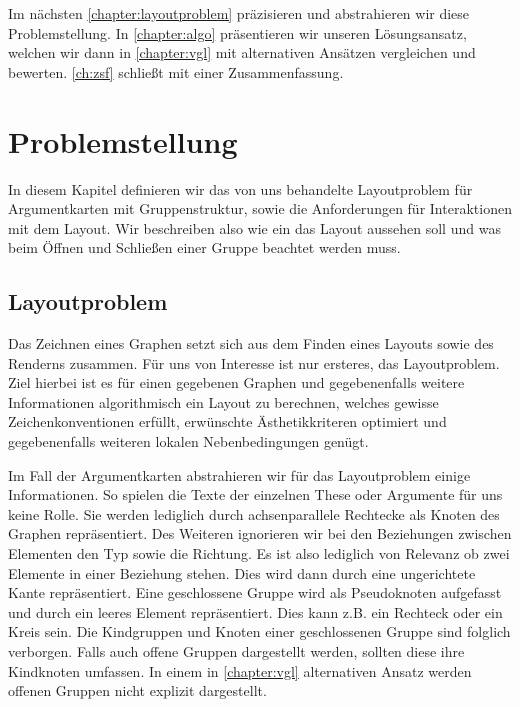 Im nächsten \autoref{chapter:layoutproblem}  präzisieren und abstrahieren wir diese Problemstellung. 
In \autoref{chapter:algo} präsentieren wir unseren Lösungsansatz, welchen wir dann in \autoref{chapter:vgl} mit alternativen Ansätzen vergleichen und bewerten.
\autoref{ch:zsf} schließt mit einer Zusammenfassung.

\chapter{Problemstellung}%
\label{chapter:layoutproblem}
In diesem Kapitel definieren wir das von uns behandelte Layoutproblem für Argumentkarten mit Gruppenstruktur, sowie die Anforderungen für Interaktionen mit dem Layout.
Wir beschreiben also wie ein das Layout aussehen soll und was beim Öffnen und Schließen einer Gruppe beachtet werden muss.

\section{Layoutproblem}
\label{sec:layoutproblem}
Das Zeichnen eines Graphen setzt sich aus dem Finden eines Layouts sowie des Renderns zusammen. 
Für uns von Interesse ist nur ersteres, das Layoutproblem. 
Ziel hierbei ist es für einen gegebenen Graphen und gegebenenfalls weitere Informationen algorithmisch ein Layout zu berechnen,
welches gewisse Zeichenkonventionen erfüllt, erwünschte Ästhetikkriteren optimiert und gegebenenfalls weiteren lokalen Nebenbedingungen genügt.

Im Fall der Argumentkarten abstrahieren wir für das Layoutproblem einige Informationen. 
So spielen die Texte der einzelnen These oder Argumente für uns keine Rolle. 
Sie werden lediglich durch achsenparallele Rechtecke als Knoten des Graphen repräsentiert.
Des Weiteren ignorieren wir bei den Beziehungen zwischen Elementen den Typ sowie die Richtung. 
Es ist also lediglich von Relevanz ob zwei Elemente in einer Beziehung stehen.
Dies wird dann durch eine ungerichtete Kante repräsentiert. 
Eine geschlossene Gruppe wird als Pseudoknoten aufgefasst und durch ein leeres Element repräsentiert.
Dies kann  z.B. ein Rechteck oder ein Kreis sein.  Die Kindgruppen und Knoten einer geschlossenen Gruppe sind folglich verborgen.
Falls auch offene Gruppen dargestellt werden, sollten diese ihre Kindknoten umfassen. 
In einem in \autoref{chapter:vgl} alternativen Ansatz werden offenen Gruppen nicht explizit dargestellt.

